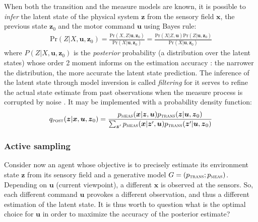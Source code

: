 \documentclass[12pt,twoside,openright]{article}
\begin{document}
When both the transition and the measure models are known, it is possible to \emph{infer} the latent state of the physical system $\boldsymbol{z}$ from the sensory field $\boldsymbol{x}$, the previous state $\boldsymbol{z}_0$ and the motor command $\boldsymbol{u}$ using Bayes rule:
\begin{align}
\text{Pr}(Z|X,\boldsymbol{u},\boldsymbol{z}_0) = \frac{\text{Pr}(X,Z|\boldsymbol{u},\boldsymbol{z}_0)}{\text{Pr}(X|\boldsymbol{u},\boldsymbol{z}_0)} %
= \frac{\text{Pr}(X|Z,\boldsymbol{u}) \text{Pr}(Z|\boldsymbol{u},\boldsymbol{z}_0)}
{\text{Pr}(X|\boldsymbol{u},\boldsymbol{z}_0)}\label{eq:post-Pr}
\end{align}
where $P(Z|X,\boldsymbol{u},\boldsymbol{z}_0)$ is the \emph{posterior} probability (a distribution over the latent states) whose order 2 moment informs on the estimation accuracy : the narrower the distribution, the more accurate the latent state prediction. 
The inference of the latent state through model inversion is called \emph{filtering} for it serves to refine the actual state estimate from past observations when the measure process is corrupted by noise \cite{Kalman1960}.
It may be implemented with a probability density function:
\begin{align}
q_\text{\sc post}(\boldsymbol{z}|\boldsymbol{x},\boldsymbol{u}, \boldsymbol{z}_0) 
= \frac{p_\text{\sc meas}(\boldsymbol{x}|\boldsymbol{z},\boldsymbol{u}) p_\text{\sc trans}(\boldsymbol{z}|\boldsymbol{u},\boldsymbol{z}_0)}
{\sum_{\boldsymbol{z}'}p_\text{\sc meas}(\boldsymbol{x}|\boldsymbol{z}',\boldsymbol{u}) p_\text{\sc trans}(\boldsymbol{z}'|\boldsymbol{u},\boldsymbol{z}_0)}\label{eq:post-pdf}
\end{align}

\subsubsection{Active sampling}
Consider now an agent whose objective is to precisely estimate its environment state $\boldsymbol{z}$ from its sensory field and a generative model $G = (p_\text{\sc trans}; p_\text{\sc meas})$.
Depending on $\boldsymbol{u}$ (current viewpoint), a different $\boldsymbol{x}$ is observed at the sensors. So, each different command $\boldsymbol{u}$ provokes a different observation, and thus a different 
estimation of the latent state. It is thus worth to question what is the optimal choice for $\boldsymbol{u}$ in order to maximize the accuracy of the posterior estimate?
\end{document}
